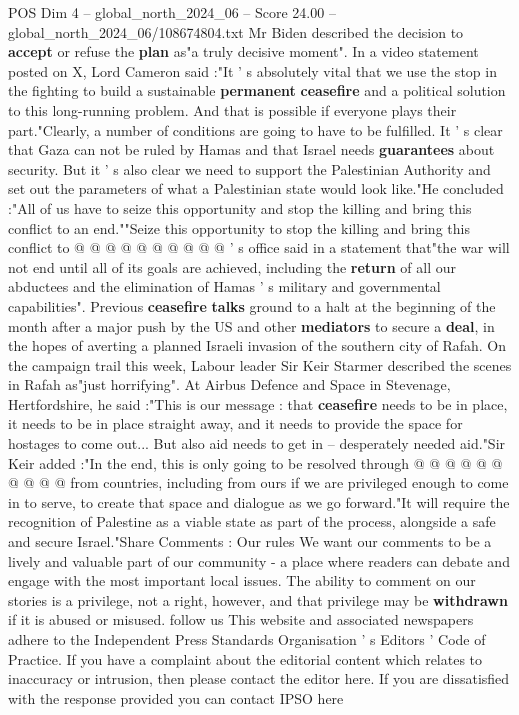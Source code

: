 \begin{textsample}{POS Dim 4 – global\_north\_2024\_06 – Score 24.00 – global\_north\_2024\_06/108674804.txt}
Mr Biden described the decision to \textbf{accept} or refuse the \textbf{plan} as"a truly decisive moment".
In a video statement posted on X, Lord Cameron said :"It ' s absolutely vital that we use the stop in the fighting to build a sustainable \textbf{permanent} \textbf{ceasefire} and a political solution to this long-running problem.
And that is possible if everyone plays their part."Clearly, a number of conditions are going to have to be fulfilled.
It ' s clear that Gaza can not be ruled by Hamas and that Israel needs \textbf{guarantees} about security.
But it ' s also clear we need to support the Palestinian Authority and set out the parameters of what a Palestinian state would look like."He concluded :"All of us have to seize this opportunity and stop the killing and bring this conflict to an end.""Seize this opportunity to stop the killing and bring this conflict to @ @ @ @ @ @ @ @ @ @ ' s office said in a statement that"the war will not end until all of its goals are achieved, including the \textbf{return} of all our abductees and the elimination of Hamas ' s military and governmental capabilities".
Previous \textbf{ceasefire} \textbf{talks} ground to a halt at the beginning of the month after a major push by the US and other \textbf{mediators} to secure a \textbf{deal}, in the hopes of averting a planned Israeli invasion of the southern city of Rafah.
On the campaign trail this week, Labour leader Sir Keir Starmer described the scenes in Rafah as"just horrifying".
At Airbus Defence and Space in Stevenage, Hertfordshire, he said :"This is our message : that \textbf{ceasefire} needs to be in place, it needs to be in place straight away, and it needs to provide the space for hostages to come out...
But also aid needs to get in -- desperately needed aid."Sir Keir added :"In the end, this is only going to be resolved through @ @ @ @ @ @ @ @ @ @ from countries, including from ours if we are privileged enough to come in to serve, to create that space and dialogue as we go forward."It will require the recognition of Palestine as a viable state as part of the process, alongside a safe and secure Israel."Share Comments : Our rules We want our comments to be a lively and valuable part of our community - a place where readers can debate and engage with the most important local issues.
The ability to comment on our stories is a privilege, not a right, however, and that privilege may be \textbf{withdrawn} if it is abused or misused. follow us This website and associated newspapers adhere to the Independent Press Standards Organisation ' s Editors ' Code of Practice.
If you have a complaint about the editorial content which relates to inaccuracy or intrusion, then please contact the editor here.
If you are dissatisfied with the response provided you can contact IPSO here

\end{textsample}
